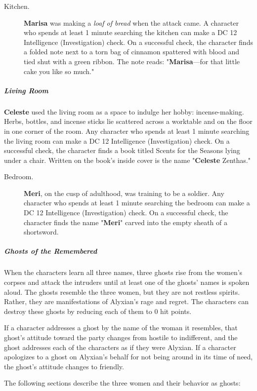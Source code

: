 \documentclass[10pt,a4paper,twoside,bg=print,twocolumn,openany,nodeprecatedcode]{dndbook}
\begin{document}
\begin{description}
\item[Kitchen.]
\textbf{Marisa} was making a \textit{loaf of bread} when the attack came. A character who spends at least 1 minute searching the kitchen can make a DC 12 Intelligence (Investigation) check. On a successful check, the character finds a folded note next to a torn bag of cinnamon spattered with blood and tied shut with a green ribbon. The note reads: "\textbf{Marisa}—for that little cake you like so much."
\end{description}

\subparagraph{Living Room}
\textbf{Celeste} used the living room as a space to indulge her hobby: incense-making. Herbs, bottles, and incense sticks lie scattered across a worktable and on the floor in one corner of the room. Any character who spends at least 1 minute searching the living room can make a DC 12 Intelligence (Investigation) check. On a successful check, the character finds a book titled Scents for the Seasons lying under a chair. Written on the book's inside cover is the name "\textbf{Celeste} Zenthas."


\begin{description}
\item[Bedroom.]
\textbf{Meri}, on the cusp of adulthood, was training to be a soldier. Any character who spends at least 1 minute searching the bedroom can make a DC 12 Intelligence (Investigation) check. On a successful check, the character finds the name "\textbf{Meri}" carved into the empty sheath of a shortsword.
\end{description}

\subparagraph{Ghosts of the Remembered}
When the characters learn all three names, three ghosts rise from the women's corpses and attack the intruders until at least one of the ghosts' names is spoken aloud. The ghosts resemble the three women, but they are not restless spirits. Rather, they are manifestations of Alyxian's rage and regret. The characters can destroy these ghosts by reducing each of them to 0 hit points.

If a character addresses a ghost by the name of the woman it resembles, that ghost's attitude toward the party changes from hostile to indifferent, and the ghost addresses each of the characters as if they were Alyxian. If a character apologizes to a ghost on Alyxian's behalf for not being around in its time of need, the ghost's attitude changes to friendly.

The following sections describe the three women and their behavior as ghosts:
\end{document}
